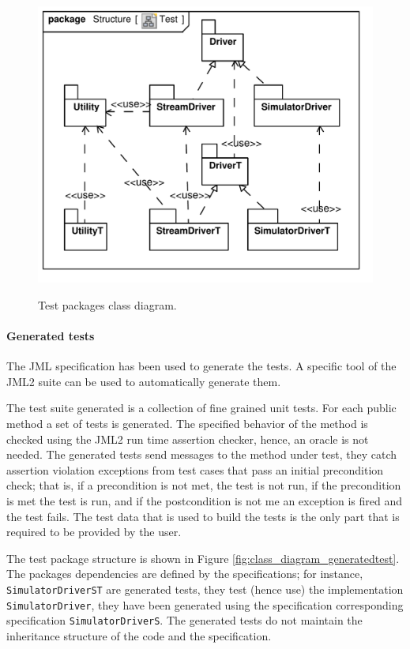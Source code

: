 \documentclass{article} \usepackage{times}
\newcommand{\lil}[1]{\texttt{\lstinline|#1|}}
\begin{document}
\begin{figure}[htb!]
  \centering
  \includegraphics[scale=0.4]{UML_model/Class_Diagram__Structure__Test}
  \label{fig:class_diagram_test}
  \caption{Test packages class diagram.}
\end{figure}

\paragraph*{Generated tests}

The JML specification has been used to generate the tests.  A specific
tool of the JML2 suite can be used to automatically generate
them\cite{Cheon-Leavens02}.

The test suite generated is a collection of fine grained unit tests.
For each public method a set of tests is generated.  The specified
behavior of the method is checked using the JML2 run time assertion
checker, hence, an oracle is not needed.  The generated tests send
messages to the method under test, they catch assertion violation
exceptions from test cases that pass an initial precondition check;
that is, if a precondition is not met, the test is not run, if the
precondition is met the test is run, and if the postcondition is not
me an exception is fired and the test fails.  The test data that is
used to build the tests is the only part that is required to be
provided by the user.

The test package structure is shown in Figure
\ref{fig:class_diagram_generatedtest}.  The packages dependencies are
defined by the specifications; for instance, \lil{SimulatorDriverST}
are generated tests, they test (hence use) the implementation
\lil{SimulatorDriver}, they have been generated using the
specification corresponding specification \lil{SimulatorDriverS}.  The
generated tests do not maintain the inheritance structure of the code
and the specification.
\end{document}
